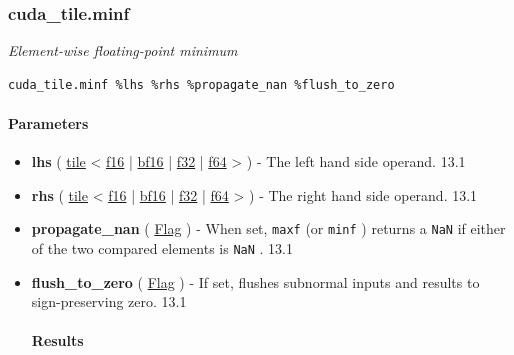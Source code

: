 \documentclass{article}
\begin{document}
\subsubsection{cuda\_tile.minf}

\textit{Element-wise floating-point minimum}


\begin{lstlisting}
cuda_tile.minf %lhs %rhs %propagate_nan %flush_to_zero
\end{lstlisting}

\paragraph{Parameters}

\begin{itemize}
\item \textbf{lhs} ( \href{https://docs.nvidia.com/cuda/tile-ir/latest/sections/types.html#type-tile}{tile} < \href{https://docs.nvidia.com/cuda/tile-ir/latest/sections/types.html#subsection-element-types}{f16} | \href{https://docs.nvidia.com/cuda/tile-ir/latest/sections/types.html#subsection-element-types}{bf16} | \href{https://docs.nvidia.com/cuda/tile-ir/latest/sections/types.html#subsection-element-types}{f32} | \href{https://docs.nvidia.com/cuda/tile-ir/latest/sections/types.html#subsection-element-types}{f64} > ) - The left hand side operand. 13.1
\item \textbf{rhs} ( \href{https://docs.nvidia.com/cuda/tile-ir/latest/sections/types.html#type-tile}{tile} < \href{https://docs.nvidia.com/cuda/tile-ir/latest/sections/types.html#subsection-element-types}{f16} | \href{https://docs.nvidia.com/cuda/tile-ir/latest/sections/types.html#subsection-element-types}{bf16} | \href{https://docs.nvidia.com/cuda/tile-ir/latest/sections/types.html#subsection-element-types}{f32} | \href{https://docs.nvidia.com/cuda/tile-ir/latest/sections/types.html#subsection-element-types}{f64} > ) - The right hand side operand. 13.1
\item \textbf{propagate\_nan} ( \href{https://docs.nvidia.com/cuda/tile-ir/latest/sections/operations.html#type-flag}{Flag} ) - When set, \texttt{maxf} (or \texttt{minf} ) returns a \texttt{NaN} if either of the two compared elements is \texttt{NaN} . 13.1
\item \textbf{flush\_to\_zero} ( \href{https://docs.nvidia.com/cuda/tile-ir/latest/sections/operations.html#type-flag}{Flag} ) - If set, flushes subnormal inputs and results to sign-preserving zero. 13.1


\paragraph{Results}


\end{itemize}
\end{document}
